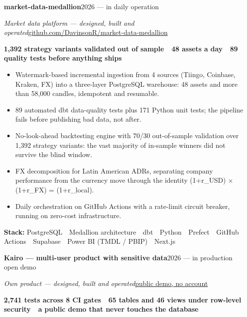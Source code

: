\documentclass[a4paper,10pt]{article}
\newcommand{\headline}[2]{\needspace{3\baselineskip}\textbf{\color{ink}#1}\hfill{\small #2}\par}
\newcommand{\subline}[2]{\textit{#1}\hfill{\small #2}\par}
\begin{document}
\vspace{4pt}
\headline{market-data-medallion}{2026 --- in daily operation}
\subline{Market data platform --- designed, built and operated}{\href{https://github.com/DavinsonR/market-data-medallion}{github.com/DavinsonR/market-data-medallion}}
{\small\bfseries\color{cold} 1,392 strategy variants validated out of sample \,\textperiodcentered\, 48 assets a day \,\textperiodcentered\, 89 quality tests before anything ships}\par
\begin{itemize}[leftmargin=1.1em, itemsep=0pt, topsep=1pt, parsep=0pt]
  \item Watermark-based incremental ingestion from 4 sources (Tiingo, Coinbase, Kraken, FX) into a three-layer PostgreSQL warehouse: 48 assets and more than 58,000 candles, idempotent and resumable.
  \item 89 automated dbt data-quality tests plus 171 Python unit tests; the pipeline fails before publishing bad data, not after.
  \item No-look-ahead backtesting engine with 70/30 out-of-sample validation over 1,392 strategy variants: the vast majority of in-sample winners did not survive the blind window.
  \item FX decomposition for Latin American ADRs, separating company performance from the currency move through the identity (1+r\_USD) $\times$ (1+r\_FX) = (1+r\_local).
  \item Daily orchestration on GitHub Actions with a rate-limit circuit breaker, running on zero-cost infrastructure.
\end{itemize}
{\small\textbf{Stack:} PostgreSQL \,\textperiodcentered\, Medallion architecture \,\textperiodcentered\, dbt \,\textperiodcentered\, Python \,\textperiodcentered\, Prefect \,\textperiodcentered\, GitHub Actions \,\textperiodcentered\, Supabase \,\textperiodcentered\, Power BI (TMDL / PBIP) \,\textperiodcentered\, Next.js}\par
\vspace{4pt}
\headline{Kairo --- multi-user product with sensitive data}{2026 --- in production \,\textperiodcentered\, open demo}
\subline{Own product --- designed, built and operated}{\href{https://kairo.davirson.com/demo}{public demo, no account}}
{\small\bfseries\color{cold} 2,741 tests across 8 CI gates \,\textperiodcentered\, 65 tables and 46 views under row-level security \,\textperiodcentered\, a public demo that never touches the database}\par
\end{document}
